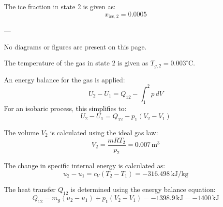 The ice fraction in state 2 is given as:  
\[
x_{\text{ice},2} = 0.0005
\]  

---

No diagrams or figures are present on this page.

The temperature of the gas in state 2 is given as \( T_{g,2} = 0.003^\circ\text{C} \).  

An energy balance for the gas is applied:  
\[
U_2 - U_1 = Q_{12} - \int_{1}^{2} p \, dV
\]  
For an isobaric process, this simplifies to:  
\[
U_2 - U_1 = Q_{12} - p_1 (V_2 - V_1)
\]  

The volume \( V_2 \) is calculated using the ideal gas law:  
\[
V_2 = \frac{m R T_2}{p_2} = 0.007 \, \text{m}^3
\]  

The change in specific internal energy is calculated as:  
\[
u_2 - u_1 = c_V (T_2 - T_1) = -316.498 \, \text{kJ/kg}
\]  

The heat transfer \( Q_{12} \) is determined using the energy balance equation:  
\[
Q_{12} = m_g (u_2 - u_1) + p_1 (V_2 - V_1) = -1398.9 \, \text{kJ} = -1400 \, \text{kJ}
\]